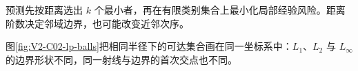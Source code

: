 \documentclass[UTF8,a4paper,11pt,openany]{ctexbook}
\begin{document}
\setcounter{page}{242}
\setcounter{chapter}{13}
\setcounter{figure}{0}
\pagestyle{headings}
\begin{optimizationbox}
\kNN{}预测先按距离选出 $k$ 个最小者，再在有限类别集合上最小化局部经验风险。距离阶数决定邻域边界，也可能改变近邻次序。
\end{optimizationbox}

图\ref{fig:V2-C02-lp-balls}把相同半径下的可达集合画在同一坐标系中：$L_1$、$L_2$ 与 $L_\infty$ 的边界形状不同，同一射线与边界的首次交点也不同。
\end{document}

